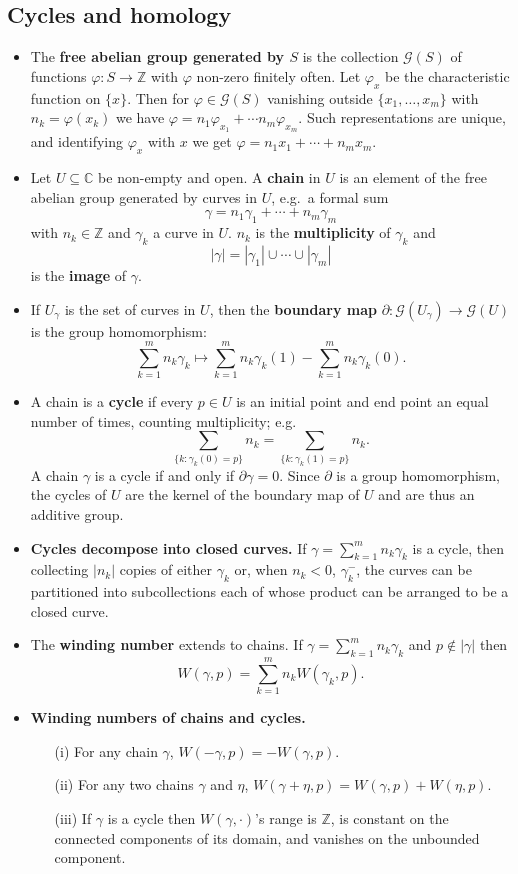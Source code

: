 \documentclass{article}
\newenvironment{topic}[1]{%
{\subsection{#1}}%
\begin{itemize}%
}{%
\end{itemize}%
}
\newcommand{\theorem}[1]{\item {\bf #1.}}
\newcommand{\term}[1]{{\bf #1}}
\newcommand{\remark}{\item}
\begin{document}
\begin{topic}{Cycles and homology}

\remark The \term{free abelian group generated by $S$} is the collection $\mathcal{G}(S)$ of functions $\varphi : S \to \mathbb{Z}$ with $\varphi$ non-zero finitely often. Let $\varphi_x$ be the characteristic function on $\{x\}$. Then for $\varphi \in \mathcal{G}(S)$ vanishing outside $\{x_1, \ldots, x_m\}$ with $n_k = \varphi(x_k)$ we have $\varphi = n_1 \varphi_{x_1} + \cdots n_m \varphi_{x_m}$. Such representations are unique, and identifying $\varphi_x$ with $x$ we get $\varphi = n_1 x_1 + \cdots + n_m x_m$.

\remark Let $U \subseteq \mathbb{C}$ be non-empty and open. A \term{chain} in $U$ is an element of the free abelian group generated by curves in $U$, e.g.\ a formal sum $$\gamma = n_1 \gamma_1 + \cdots + n_m \gamma_m$$ with $n_k \in \mathbb{Z}$ and $\gamma_k$ a curve in $U$. $n_k$ is the \term{multiplicity} of $\gamma_k$ and $$|\gamma| = |\gamma_1| \cup \cdots \cup |\gamma_m|$$ is the \term{image} of $\gamma$.

\remark If $U_\gamma$ is the set of curves in $U$, then the \term{boundary map} $\partial : \mathcal{G}(U_\gamma) \to \mathcal{G}(U)$ is the group homomorphism:
$$\sum_{k=1}^m n_k \gamma_k \mapsto \sum_{k=1}^m n_k \gamma_k(1) - \sum_{k=1}^m n_k \gamma_k(0).$$

\remark A chain is a \term{cycle} if every $p \in U$ is an initial point and end point an equal number of times, counting multiplicity; e.g. $$\sum_{\{k:\gamma_k(0)=p\}} n_k = \sum_{\{k:\gamma_k(1)=p\}} n_k.$$ A chain $\gamma$ is a cycle if and only if $\partial\gamma = 0$. Since $\partial$ is a group homomorphism, the cycles of $U$ are the kernel of the boundary map of $U$ and are thus an additive group.

\theorem{Cycles decompose into closed curves} If $\gamma = \sum_{k=1}^m n_k \gamma_k$ is a cycle, then collecting $|n_k|$ copies of either $\gamma_k$ or, when $n_k < 0$, $\gamma_k^-$, the curves can be partitioned into subcollections each of whose product can be arranged to be a closed curve.

\remark The \term{winding number} extends to chains. If $\gamma = \sum_{k=1}^m n_k \gamma_k$ and $p \not\in |\gamma|$ then $$W(\gamma, p) = \sum_{k=1}^m n_k W(\gamma_k, p).$$

\theorem{Winding numbers of chains and cycles} \begin{enumerate}
\item[(i)] For any chain $\gamma$, $W(-\gamma, p) = -W(\gamma, p)$.
\item[(ii)] For any two chains $\gamma$ and $\eta$, $W(\gamma + \eta, p) = W(\gamma, p) + W(\eta, p)$.
\item[(iii)] If $\gamma$ is a cycle then $W(\gamma, \cdot)$'s range is $\mathbb{Z}$, is constant on the connected components of its domain, and vanishes on the unbounded component.
\end{enumerate}


\end{topic}
\end{document}
